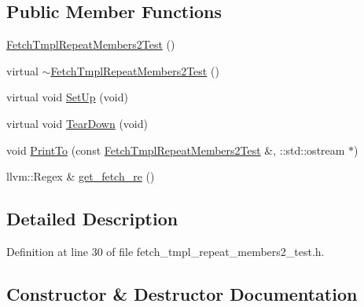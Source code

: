 \subsection*{Public Member Functions}
\begin{DoxyCompactItemize}
\item 
\hyperlink{classclang_1_1tidy_1_1pagesjaunes_1_1test_1_1_fetch_tmpl_repeat_members2_test_a3b78799417d3ccf6fc3542813f58b7c8}{Fetch\+Tmpl\+Repeat\+Members2\+Test} ()
\item 
virtual \hyperlink{classclang_1_1tidy_1_1pagesjaunes_1_1test_1_1_fetch_tmpl_repeat_members2_test_a6019fdccc9bc513ddeb6f6b8f567a239}{$\sim$\+Fetch\+Tmpl\+Repeat\+Members2\+Test} ()
\item 
virtual void \hyperlink{classclang_1_1tidy_1_1pagesjaunes_1_1test_1_1_fetch_tmpl_repeat_members2_test_a483158b36f7bcad32d8c8ffc396f37f7}{Set\+Up} (void)
\item 
virtual void \hyperlink{classclang_1_1tidy_1_1pagesjaunes_1_1test_1_1_fetch_tmpl_repeat_members2_test_ad108e79b9317a18cc54a55797d2519b6}{Tear\+Down} (void)
\item 
void \hyperlink{classclang_1_1tidy_1_1pagesjaunes_1_1test_1_1_fetch_tmpl_repeat_members2_test_aea87140ad60c9f846e24d399f0897de7}{Print\+To} (const \hyperlink{classclang_1_1tidy_1_1pagesjaunes_1_1test_1_1_fetch_tmpl_repeat_members2_test}{Fetch\+Tmpl\+Repeat\+Members2\+Test} \&, \+::std\+::ostream $\ast$)
\item 
llvm\+::\+Regex \& \hyperlink{classclang_1_1tidy_1_1pagesjaunes_1_1test_1_1_fetch_tmpl_repeat_members2_test_ad9f4aebd4b4c8047633817645148133b}{get\+\_\+fetch\+\_\+re} ()
\end{DoxyCompactItemize}


\subsection{Detailed Description}


Definition at line 30 of file fetch\+\_\+tmpl\+\_\+repeat\+\_\+members2\+\_\+test.\+h.



\subsection{Constructor \& Destructor Documentation}
\mbox{\label{classclang_1_1tidy_1_1pagesjaunes_1_1test_1_1_fetch_tmpl_repeat_members2_test_a3b78799417d3ccf6fc3542813f58b7c8}} 
